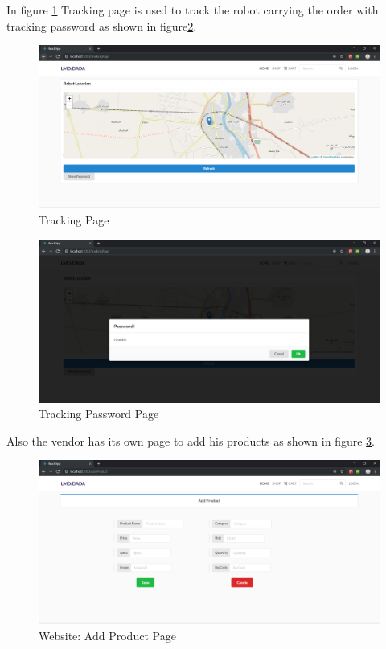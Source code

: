 In figure \ref{fig: tracking} Tracking page is used to track the robot carrying the order with tracking password as shown in figure\ref{fig:trackPas}.
  \begin{figure}[htp]%
    \center%
    \includegraphics[width=1\textwidth]{images/Software/tracking.PNG}%
    \caption[Website: Tracking Page]{Tracking Page}\label{fig: tracking}%
  \end{figure}
  
    \begin{figure}[htp]%
    \center%
    \includegraphics[width=1\textwidth]{images/Software/trackingPassword.PNG}%
    \caption[Website: Tracking Password Page]{ Tracking Password Page}\label{fig:trackPas}%
  \end{figure}
  
Also the vendor has its own page to add his products as shown in figure \ref{fig: add Product}.
  \begin{figure}[htp]%
    \center%
    \includegraphics[width=1\textwidth]{images/Software/addProduct.PNG}%
    \caption[Website: Add Product Page]{Website: Add Product Page}\label{fig: add Product}%
  \end{figure} \newpage
  
